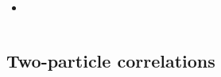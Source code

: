 \documentclass[aspectratio=169,11pt,usenames,dvipsnames]{beamer}
\begin{document}
\begin{frame}
\begin{columns}[onlytextwidth,t]
\begin{center}
        \begin{itemize}
            \itemsep0em
            \item {\color{palteal}}
        \end{itemize}

       \end{center}
    \end{columns}
\end{frame}


\subsection{Two-particle correlations}
\end{document}
